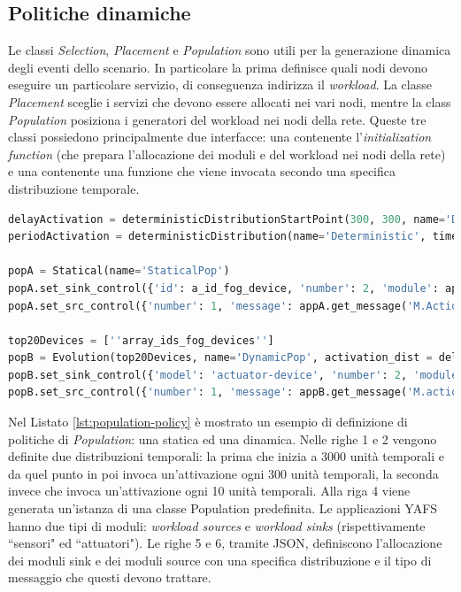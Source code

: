 \subsection{Politiche dinamiche}
Le classi \textit{Selection}, \textit{Placement} e \textit{Population} sono utili per la generazione dinamica degli eventi dello scenario. In particolare la prima definisce quali nodi devono eseguire un particolare servizio, di conseguenza indirizza il \textit{workload}. La classe \textit{Placement} sceglie i servizi che devono essere allocati nei vari nodi, mentre la class \textit{Population} posiziona i generatori del workload nei nodi della rete. Queste tre classi possiedono principalmente due interfacce: una contenente l'\textit{initialization function} (che prepara l'allocazione dei moduli e del workload nei nodi della rete) e una contenente una funzione che viene invocata secondo una specifica distribuzione temporale.

\begin{lstlisting}[language=python, caption={Definizione di due Population policies: una statica (\texttt{popA}) ed una dinamica (\texttt{popB}) \cite{YAFSSimulator}}, captionpos=b, label={lst:population-policy}]
delayActivation = deterministicDistributionStartPoint(300, 300, name='Deterministic')
periodActivation = deterministicDistribution(name='Deterministic', time=100)

popA = Statical(name='StaticalPop')
popA.set_sink_control({'id': a_id_fog_device, 'number': 2, 'module': appA.get_sink_modules()})
popA.set_src_control({'number': 1, 'message': appA.get_message('M.Action'), 'distribution': periodicActivation})

top20Devices = [''array_ids_fog_devices'']
popB = Evolution(top20Devices, name='DynamicPop', activation_dist = delayActivation)
popB.set_sink_control({'model': 'actuator-device', 'number': 2, 'module': appB.get_sink_control()})
popB.set_src_control({'number': 1, 'message': appB.get_message('M.action'), 'distribution': periodicActivation})

\end{lstlisting}

Nel Listato \ref{lst:population-policy} è mostrato un esempio di definizione di politiche di \textit{Population}: una statica ed una dinamica. Nelle righe 1 e 2 vengono definite due distribuzioni temporali: la prima che inizia a 3000 unità temporali e da quel punto in poi invoca un'attivazione ogni 300 unità temporali, la seconda invece che invoca un'attivazione ogni 10 unità temporali. Alla riga 4 viene generata un'istanza di una classe Population predefinita. Le applicazioni YAFS hanno due tipi di moduli: \textit{workload sources} e \textit{workload sinks} (rispettivamente ``sensori" ed ``attuatori"). Le righe 5 e 6, tramite JSON, definiscono l'allocazione dei moduli sink e dei moduli source con una specifica distribuzione e il tipo di messaggio che questi devono trattare.

